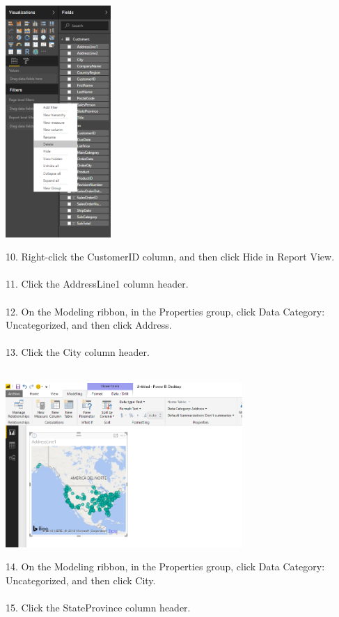 \documentclass[12pt,letterpaper]{article}
\begin{document}
\begin{center}
\includegraphics[width=4cm]{IMG/5.png} 
\end{center}
10. Right-click the CustomerID column, and then click Hide in Report View.\\\\
11. Click the AddressLine1 column header.\\\\
12. On the Modeling ribbon, in the Properties group, click Data Category: Uncategorized, and then click Address.\\\\
13. Click the City column header.\\\\
\begin{center}
\includegraphics[width=9cm]{IMG/6.png} 
\end{center}
14. On the Modeling ribbon, in the Properties group, click Data Category: Uncategorized, and then click City.\\\\
15. Click the StateProvince column header.\\\\
\end{document}
